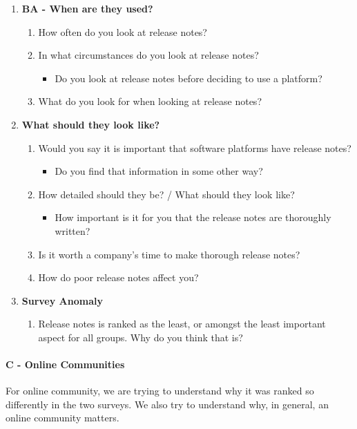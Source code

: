 \documentclass{article}
\begin{document}
\begin{enumerate}[label=B\Alph*]
\item \textbf{BA - When are they used?}
\begin{enumerate}[label=BA\arabic*]
\item How often do you look at release notes?
\item In what circumstances do you look at release notes?
\begin{itemize}[label={-}]
\item Do you look at release notes before deciding to use a platform?
\end{itemize}
\item What do you look for when looking at release notes?
\end{enumerate}
\item \textbf{What should they look like?}

\begin{enumerate}[label=BB\arabic*]
\item Would you say it is important that software platforms have release notes?
\begin{itemize}[label={-}]
\item Do you find that information in some other way?
\end{itemize}
\item How detailed should they be? / What should they look like?
\begin{itemize}[label={-}]
\item How important is it for you that the release notes are thoroughly written?
\end{itemize}
\item Is it worth a company's time to make thorough release notes?
\item How do poor release notes affect you?
\end{enumerate}
\item \textbf{Survey Anomaly}
\begin{enumerate}[label=BC\arabic*]
\item Release notes is ranked as the least, or amongst the least important aspect for all groups. Why do you think that is?
\end{enumerate}
\end{enumerate}


\paragraph{C - Online Communities}
For online community, we are trying to understand why it was ranked
so differently in the two surveys. We also try to understand why, in general,
an online community matters.
\end{document}
